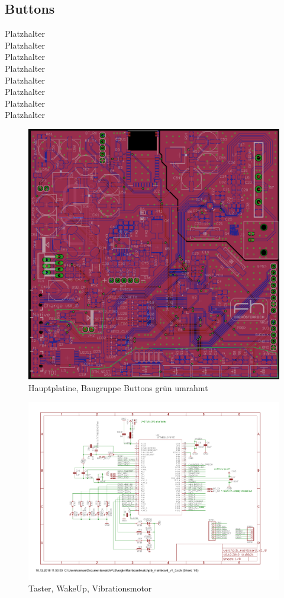 \documentclass[a4paper]{scrartcl}
\begin{document}
\subsection{Buttons}

Platzhalter\\Platzhalter\\Platzhalter\\Platzhalter\\Platzhalter\\Platzhalter\\
Platzhalter\\Platzhalter

\begin{figure}[H]\centering
\includegraphics[page=1, angle=0, width=\linewidth]{../Documentation/pics/mainboard_buttons.png}
\caption{Hauptplatine, Baugruppe Buttons grün umrahmt}
\end{figure}

\begin{figure}[H]\centering
\includegraphics[page=3, angle=90, width=\linewidth]{../eagle/Mainboard/watchplb_mainboard_v1_0.pdf}
\caption{Taster, WakeUp, Vibrationsmotor}
\end{figure}
\end{document}
